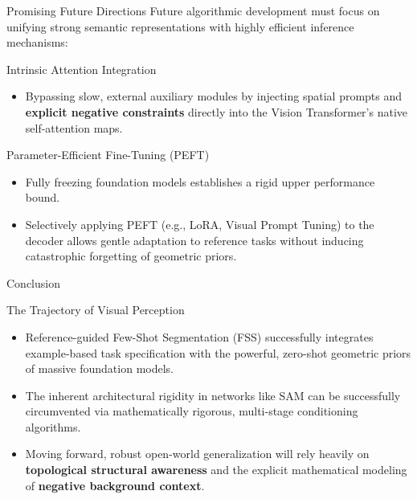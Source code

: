 \documentclass[aspectratio=169, 10pt]{beamer}
\begin{document}
\begin{frame}{Promising Future Directions}
    Future algorithmic development must focus on unifying strong semantic representations with highly efficient inference mechanisms:
    
    \begin{block}{Intrinsic Attention Integration}
        \begin{itemize}
            \item Bypassing slow, external auxiliary modules by injecting spatial prompts and \textbf{explicit negative constraints} directly into the Vision Transformer's native self-attention maps.
        \end{itemize}
    \end{block}
    
    \begin{block}{Parameter-Efficient Fine-Tuning (PEFT)}
        \begin{itemize}
            \item Fully freezing foundation models establishes a rigid upper performance bound.
            \item Selectively applying PEFT (e.g., LoRA, Visual Prompt Tuning) to the decoder allows gentle adaptation to reference tasks without inducing catastrophic forgetting of geometric priors.
        \end{itemize}
    \end{block}
\end{frame}

\begin{frame}{Conclusion}
    \begin{exampleblock}{The Trajectory of Visual Perception}
        \begin{itemize}
            \item Reference-guided Few-Shot Segmentation (FSS) successfully integrates example-based task specification with the powerful, zero-shot geometric priors of massive foundation models.
            \item The inherent architectural rigidity in networks like SAM can be successfully circumvented via mathematically rigorous, multi-stage conditioning algorithms.
            \item Moving forward, robust open-world generalization will rely heavily on \textbf{topological structural awareness} and the explicit mathematical modeling of \textbf{negative background context}.
        \end{itemize}
    \end{exampleblock}
\end{frame}
\end{document}
